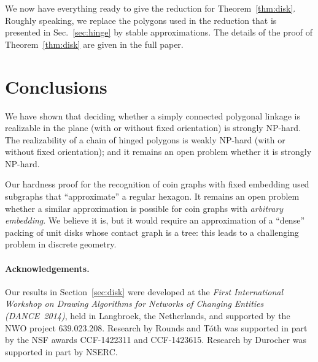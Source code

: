 \documentclass{article}
\theoremstyle{plain}%
\begin{document}
We now have everything ready to give the reduction for Theorem~\ref{thm:disk}. Roughly speaking, we replace the polygons used in the reduction
that is presented in Sec.~\ref{sec:hinge} by stable approximations. The details of the proof of Theorem~\ref{thm:disk} are given in the full paper.

\section{Conclusions \label{sec:con}}

We have shown that deciding whether a simply connected polygonal linkage is realizable in the plane (with or without fixed orientation) is strongly NP-hard. The realizability of a chain of hinged polygons is weakly NP-hard (with or without fixed orientation); and it remains an open problem whether it is strongly NP-hard. 
 
Our hardness proof for the recognition of coin graphs with fixed embedding used subgraphs that ``approximate'' a regular hexagon. It remains an open problem whether a similar approximation is possible for coin graphs with \emph{arbitrary embedding}. We believe it is, but it would require an approximation of a ``dense'' packing of unit disks whose contact graph is a tree: this leads to a challenging problem in discrete geometry.

\paragraph{\bf Acknowledgements.} Our results in Section~\ref{sec:disk} were developed at the \emph{First International Workshop on Drawing Algorithms for Networks of Changing Entities (DANCE~2014)}, held in Langbroek, the Netherlands, and supported by the NWO project 639.023.208.
Research by Rounds and T\'oth was supported in part by the NSF awards CCF-1422311 and CCF-1423615.
Research by Durocher was supported in part by NSERC.
\end{document}
